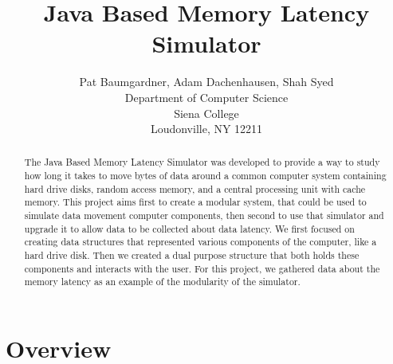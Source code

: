 \documentclass[12pt]{article}
\newcommand{\doublespace}{
  \protect\renewcommand\baselinestretch{1.5}
  \protect\normalsize
}
\begin{document}
\date{}

\title{Java Based Memory Latency Simulator}

\author{Pat Baumgardner, Adam Dachenhausen, Shah Syed\\
Department of Computer Science\\
Siena College\\
Loudonville, NY  12211
}

\maketitle
\thispagestyle{empty}

\begin{abstract}

The Java Based Memory Latency Simulator was developed to provide a way to
study how long it takes to move bytes of data around a common computer
system containing hard drive disks, random access memory, and a central
processing unit with cache memory. This project aims first to create a modular
system, that could be used to simulate data movement computer components, then
second to use that simulator and upgrade it to allow data to be collected about
data latency. We first focused on creating data structures that represented various
components of the computer, like a hard drive disk. Then we created a dual purpose
structure that both holds these components and interacts with the user. For this project,
we gathered data about the memory latency as an example of the modularity of the simulator.
  
\end{abstract}

\doublespace

\section{Overview}
\label{sec:overview}
\end{document}
